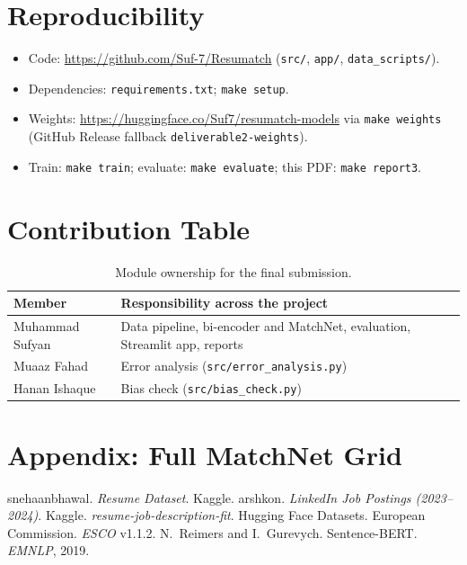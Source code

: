 \documentclass[11pt,a4paper]{article}
\newcommand{\code}[1]{\texttt{\small #1}}
\begin{document}
\section{Reproducibility}
\begin{itemize}
\item Code: \url{https://github.com/Suf-7/Resumatch} (\code{src/}, \code{app/}, \code{data\_scripts/}).
\item Dependencies: \code{requirements.txt}; \code{make setup}.
\item Weights: \url{https://huggingface.co/Suf7/resumatch-models} via \code{make weights}
(GitHub Release fallback \code{deliverable2-weights}).
\item Train: \code{make train}; evaluate: \code{make evaluate}; this PDF: \code{make report3}.
\end{itemize}

\section{Contribution Table}


\begin{table}[H]
\centering\small
\begin{tabularx}{\linewidth}{@{}l L@{}}
\toprule
Member & Responsibility across the project\\
\midrule
Muhammad Sufyan & Data pipeline, bi-encoder and MatchNet, evaluation, Streamlit app, reports\\
Muaaz Fahad & Error analysis (\code{src/error\_analysis.py})\\
Hanan Ishaque & Bias check (\code{src/bias\_check.py})\\
\bottomrule
\end{tabularx}
\caption{Module ownership for the final submission.}
\end{table}

\clearpage
\section{Appendix: Full MatchNet Grid}


\begin{thebibliography}{9}\small
{} snehaanbhawal. \emph{Resume Dataset}. Kaggle.
 arshkon. \emph{LinkedIn Job Postings (2023--2024)}. Kaggle.
 \emph{resume-job-description-fit}. Hugging Face Datasets.
 European Commission. \emph{ESCO} v1.1.2.
 N.~Reimers and I.~Gurevych. Sentence-BERT. \emph{EMNLP}, 2019.
\end{thebibliography}
\end{document}
